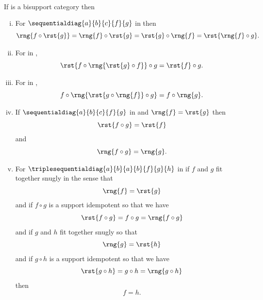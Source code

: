 \begin{lemma}
 If \catcw is a bisupport category then
 \begin{enumerate}[(i)]
 \item
 For $\sequentialdiag{a}{b}{c}{f}{g}$ in \catcw  then
\[
\rng{f \circ \rst{g}}
= \rng{f} \circ \rst{g}
= \rst{g} \circ \rng{f}
= \rst{\rng{f} \circ g}.
\]
\item
For \fgsourcediag in \catc, 
\[
\rst{f \circ \rng{\rst{g} \circ f}} \circ g = \rst{f} \circ g.
\]
\item
For \fgsinkdiag in \catc, 
\[
f \circ \rng{\rst{g \circ \rng{f}} \circ g} = f \circ \rng{g}.
\]
 \item %
If $\sequentialdiag{a}{b}{c}{f}{g}$ in \catcw  and
$\rng{f} = \rst{g}$ then 
\[
\rst{f \circ g} = \rst{f}
\]
and
\[
\rng{f \circ g}  = \rng{g}.
\]
\item %
For $\triplesequentialdiag{a}{b}{a}{b}{f}{g}{h}$ in \catcw \newline
if $f$ and $g$ fit together snugly in the sense that 
\[
\rng{f} = \rst{g}
\]
and if $f \circ g$ is a support idempotent so that we have
\[
\rst{f \circ g} = f \circ g = \rng{f \circ g}
\]
and if $g$ and $h$ fit together snugly so that 
\[
\rng{g} = \rst{h}
\]
and if $g \circ h$ is a support idempotent so that we have
\[
\rst{g \circ h} = g \circ h = \rng{g \circ h}
\]
then
\[
f = h.
\]
\end{enumerate}
\end{lemma}
